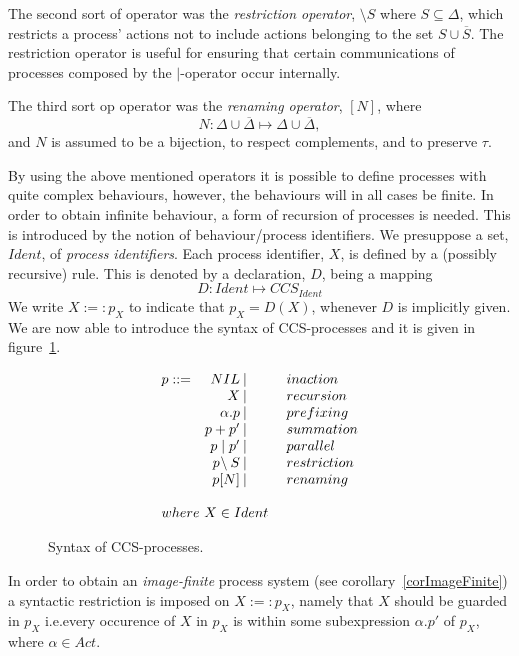 The second sort of operator was the {\it restriction operator}, $\setminus S$ where $S\subseteq\Delta$, which restricts a process' actions not to include actions belonging to the set $S\cup\overline{S}$. The restriction operator is useful for ensuring that certain communications of processes composed by the $\mid$-operator occur internally.

The third sort op operator was the {\it renaming operator}, $[N]$, where
\begin{equation}
N : \Delta\cup\overline{\Delta}\mapsto\Delta\cup\overline{\Delta},
\end{equation}
and $N$ is assumed to be a bijection, to respect complements, and to preserve $\tau$.

By using the above mentioned operators it is possible to define processes with quite complex behaviours, however, the behaviours will in all cases be finite. In order to obtain infinite behaviour, a form of recursion of processes is needed. This is introduced by the notion of behaviour/process identifiers. We presuppose a set, $Ident$, of {\it process identifiers}. Each process identifier, $X$, is defined by a (possibly recursive) rule. This is denoted by a declaration, $D$, being a mapping
\[
D: Ident\mapsto CCS_{Ident}
\]
We write $X:=: p_X$ to indicate that $p_X = D(X)$, whenever $D$ is implicitly given. We are now able to introduce the syntax of CCS-processes and it is given in figure~\ref{figCCSproc}.

\begin{figure}
\[
\begin{array}{lr@{\:\mid\extracolsep{1cm}}l}
p::= & NIL          & inaction \\
     &   X          & recursion \\
     & \alpha.p     & prefixing \\
     & p + p'       & summation \\
     & p\mid p'     & parallel \\
     & p\!\setminus S & restriction \\
     & p[N]         & renaming \\
\\
\multicolumn{3}{l}{where\ X\in Ident}
\end{array}
\]
\caption{Syntax of CCS-processes.}\label{figCCSproc}
\end{figure}

In order to obtain an {\it image-finite\/} process system (see corollary~\ref{corImageFinite}) a syntactic restriction is imposed on $X :=: p_X$, namely that $X$ should be guarded in $p_X$ i.e.\@ every occurence of $X$ in $p_X$ is within some subexpression $\alpha.p'$ of $p_X$, where $\alpha\in Act$.

